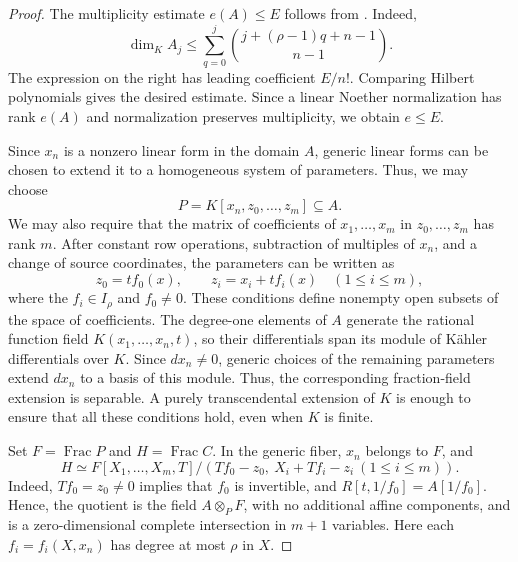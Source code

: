 \documentclass[12pt]{amsart}
\numberwithin{equation}{section}
\theoremstyle{definition}
\theoremstyle{remark}
\numberwithin{equation}{section}
\begin{document}
\begin{proof}
The multiplicity estimate $e(A)\le E$ follows from \cite[Theorem~3.2.4]{Lynn}. Indeed,
\[
 \dim_K A_j \le\sum_{q=0}^j \binom{j+(\rho-1)q+n-1}{n-1}.
\]
The expression on the right has leading coefficient $E/n!$. Comparing Hilbert polynomials gives the desired estimate. Since a linear Noether normalization has rank $e(A)$ and normalization preserves multiplicity, we obtain $e\le E$.

Since $x_n$ is a nonzero linear form in the domain $A$, generic linear forms can be chosen to extend it to a homogeneous system of parameters. Thus, we may choose
\[
 P=K[x_n,z_0,\ldots,z_m]\subseteq A.
\]
We may also require that the matrix of coefficients of $x_1,\ldots,x_m$ in $z_0,\ldots,z_m$ has rank $m$. After constant row operations, subtraction of multiples of $x_n$, and a change of source coordinates, the parameters can be written as
\begin{equation}\label{eq:source-parameters}
 z_0=t f_0(x),\qquad z_i=x_i+t f_i(x)\quad(1\le i\le m),
\end{equation}
where the $f_i\in I_\rho$ and $f_0\ne0$. These conditions define nonempty open subsets of the space of coefficients. The degree-one elements of $A$ generate the rational function field $K(x_1,\ldots,x_n,t)$, so their differentials span its module of K\"ahler differentials over $K$. Since $dx_n\ne0$, generic choices of the remaining parameters extend $dx_n$ to a basis of this module. Thus, the corresponding fraction-field extension is separable. A purely transcendental extension of $K$ is enough to ensure that all these conditions hold, even when $K$ is finite.

Set $F=\operatorname{Frac}P$ and $H=\operatorname{Frac}C$. In the generic fiber, $x_n$ belongs to $F$, and
\begin{equation}\label{eq:source-affine-CI}
 H\simeq F[X_1,\ldots,X_m,T]/ (Tf_0-z_0,\ X_i+Tf_i-z_i\ (1\le i\le m)).
\end{equation}
Indeed, $Tf_0=z_0\ne0$ implies that $f_0$ is invertible, and $R[t,1/f_0]=A[1/f_0]$. Hence, the quotient is the field $A\otimes_PF$, with no additional affine components, and is a zero-dimensional complete intersection in $m+1$ variables. Here each $f_i=f_i(X,x_n)$ has degree at most $\rho$ in $X$.



\end{proof}
\end{document}
